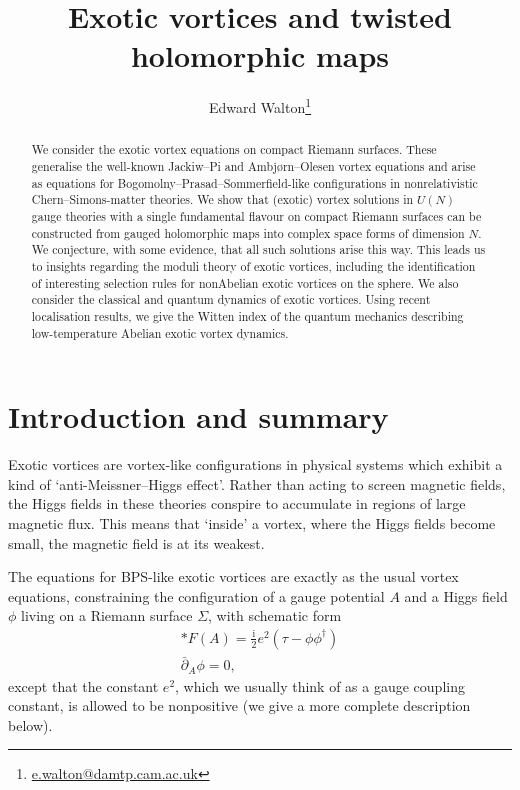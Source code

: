 \documentclass[10pt]{article}
\title{Exotic vortices and twisted holomorphic maps}
\author{Edward Walton\thanks{\href{mailto:e.walton@damtp.cam.ac.uk}{e.walton@damtp.cam.ac.uk}}}
\affil{\small{\textit{Department of Applied Mathematics and Theoretical Physics,}\\
\textit{University of Cambridge,}\\
\textit{Wilberforce Road, Cambridge, UK}}\\ \vspace{-1cm}}
\date{}
\newcommand{\ii}{\text{i}}
\newcommand{\db}{\bar{\partial}}
\theoremstyle{definition}
\begin{document}
\maketitle

\begin{abstract}	
We consider the exotic vortex equations on compact Riemann surfaces. These generalise the well-known Jackiw--Pi and Ambj{\o}rn--Olesen vortex equations and arise as equations for Bogomolny--Prasad--Sommerfield-like configurations in nonrelativistic Chern--Simons-matter theories. We show that (exotic) vortex solutions in \(U(N)\) gauge theories with a single fundamental flavour on compact Riemann surfaces can be constructed from gauged holomorphic maps into complex space forms of dimension \(N\). We conjecture, with some evidence, that all such solutions arise this way. This leads us to insights regarding the moduli theory of exotic vortices, including the identification of interesting selection rules for nonAbelian exotic vortices on the sphere. We also consider the classical and quantum dynamics of exotic vortices. Using recent localisation results, we give the Witten index of the quantum mechanics describing low-temperature Abelian exotic vortex dynamics. 
\end{abstract}


\section{Introduction and summary}

Exotic vortices are vortex-like configurations in physical systems which exhibit a kind of `anti-Meissner--Higgs effect'. Rather than acting to screen magnetic fields, the Higgs fields in these theories conspire to accumulate in regions of large magnetic flux. This means that `inside' a vortex, where the Higgs fields become small, the magnetic field is at its weakest.

The equations for BPS-like exotic vortices are exactly as the usual vortex equations, constraining the configuration of a gauge potential \(A\) and a Higgs field \(\phi\) living on a Riemann surface \(\Sigma\), with schematic form
\begin{equation}
\label{eq:ev}
\begin{gathered}
*F(A) = \frac{\ii}{2} e^2(\tau - \phi \phi^\dagger)  \\
\db_A \phi = 0 \text{,}
\end{gathered}
\end{equation}
except that the constant \(e^2\), which we usually think of as a gauge coupling constant, is allowed to be nonpositive (we give a more complete description below). 
\end{document}
